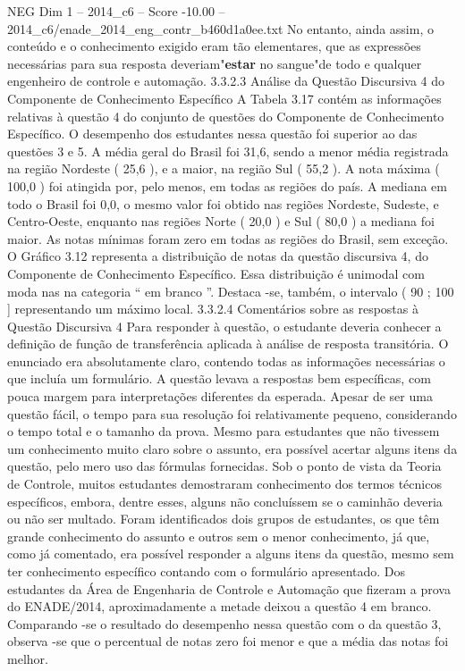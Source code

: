 \begin{textsample}{NEG Dim 1 – 2014\_c6 – Score -10.00 – 2014\_c6/enade\_2014\_eng\_contr\_b460d1a0ee.txt}
No entanto, ainda assim, o conteúdo e o conhecimento exigido eram tão elementares, que as expressões necessárias para sua resposta deveriam"\textbf{estar} no sangue"de todo e qualquer engenheiro de controle e automação. 3.3.2.3 Análise da Questão Discursiva 4 do Componente de Conhecimento Específico A Tabela 3.17 contém as informações relativas à questão 4 do conjunto de questões do Componente de Conhecimento Específico.
O desempenho dos estudantes nessa questão foi superior ao das questões 3 e 5.
A média geral do Brasil foi 31,6, sendo a menor média registrada na região Nordeste ( 25,6 ), e a maior, na região Sul ( 55,2 ).
A nota máxima ( 100,0 ) foi atingida por, pelo menos, em todas as regiões do país.
A mediana em todo o Brasil foi 0,0, o mesmo valor foi obtido nas regiões Nordeste, Sudeste, e Centro-Oeste, enquanto nas regiões Norte ( 20,0 ) e Sul ( 80,0 ) a mediana foi maior.
As notas mínimas foram zero em todas as regiões do Brasil, sem exceção.
O Gráfico 3.12 representa a distribuição de notas da questão discursiva 4, do Componente de Conhecimento Específico.
Essa distribuição é unimodal com moda nas na categoria “ em branco ”.
Destaca -se, também, o intervalo ( 90 ; 100 ] representando um máximo local. 3.3.2.4 Comentários sobre as respostas à Questão Discursiva 4 Para responder à questão, o estudante deveria conhecer a definição de função de transferência aplicada à análise de resposta transitória.
O enunciado era absolutamente claro, contendo todas as informações necessárias o que incluía um formulário.
A questão levava a respostas bem específicas, com pouca margem para interpretações diferentes da esperada.
Apesar de ser uma questão fácil, o tempo para sua resolução foi relativamente pequeno, considerando o tempo total e o tamanho da prova.
Mesmo para estudantes que não tivessem um conhecimento muito claro sobre o assunto, era possível acertar alguns itens da questão, pelo mero uso das fórmulas fornecidas.
Sob o ponto de vista da Teoria de Controle, muitos estudantes demostraram conhecimento dos termos técnicos específicos, embora, dentre esses, alguns não concluíssem se o caminhão deveria ou não ser multado.
Foram identificados dois grupos de estudantes, os que têm grande conhecimento do assunto e outros sem o menor conhecimento, já que, como já comentado, era possível responder a alguns itens da questão, mesmo sem ter conhecimento específico contando com o formulário apresentado.
Dos estudantes da Área de Engenharia de Controle e Automação que fizeram a prova do ENADE/2014, aproximadamente a metade deixou a questão 4 em branco.
Comparando -se o resultado do desempenho nessa questão com o da questão 3, observa -se que o percentual de notas zero foi menor e que a média das notas foi melhor.

\end{textsample}
